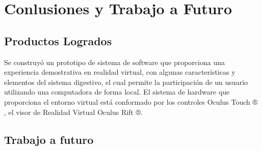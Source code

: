 \chapter{Conlusiones y Trabajo a Futuro}

\section{Productos Logrados}
Se construyó un prototipo de sistema de  software que proporciona una experiencia demostrativa en realidad virtual, con algunas características y 
elementos del sistema digestivo, el cual  permite la participación de un usuario utilizando una computadora de forma local. El sistema de hardware 
que proporciona el entorno virtual está conformado por los controles Oculus Touch ® , el visor de Realidad Virtual Oculus Rift ®. 

\section{Trabajo a futuro}

